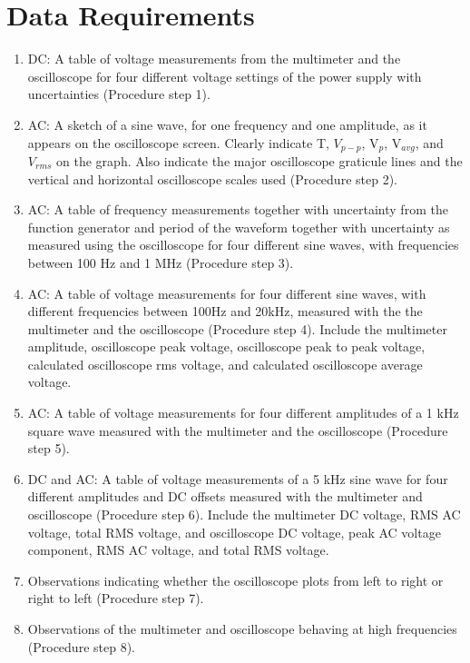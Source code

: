 \section{{\bf Data Requirements}}
\begin{enumerate}[resume]
\item DC: A table of voltage measurements from the multimeter and the oscilloscope for four different voltage settings of the power supply with uncertainties (Procedure step 1).

\item AC: A sketch of a sine wave, for one frequency and one amplitude, as it appears on the oscilloscope screen. Clearly indicate T, $V_{p-p}$, V$_p$, V$_{avg}$, and $V_{rms}$ on the graph. Also indicate the major oscilloscope graticule lines and the vertical and horizontal oscilloscope scales used (Procedure step 2).

\item AC: A table of frequency measurements together with uncertainty from the function generator and period of the waveform together with uncertainty as measured using the oscilloscope for four different sine waves, with frequencies between 100 Hz and 1 MHz (Procedure step 3).

\item AC: A table of voltage measurements for four different sine waves, with different frequencies between 100Hz and 20kHz, measured with the the multimeter and the oscilloscope (Procedure step 4). Include the multimeter amplitude, oscilloscope peak voltage, oscilloscope peak to peak voltage, calculated oscilloscope rms voltage, and calculated oscilloscope average voltage.
 
\item AC: A table of voltage measurements for four different amplitudes of a 1 kHz square wave measured with the multimeter and the oscilloscope (Procedure step 5).

\item DC and AC: A table of voltage measurements of a 5 kHz sine wave for four different amplitudes and DC offsets measured with the multimeter and oscilloscope (Procedure step 6). Include the multimeter DC voltage, RMS AC voltage, total RMS voltage, and oscilloscope DC voltage, peak AC voltage component, RMS AC voltage, and total RMS voltage.

\item Observations indicating whether the oscilloscope plots from left to right or right to left (Procedure step 7).
 
\item Observations of the multimeter and oscilloscope behaving at high frequencies (Procedure step 8).
\end{enumerate}



